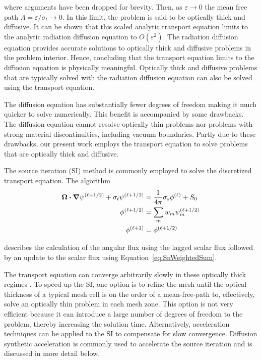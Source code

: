 \documentclass{article}
\begin{document}
\noindent where arguments have been dropped for brevity. Then, as $\varepsilon \rightarrow 0$ the mean free path $\Lambda = \varepsilon / \sigma_t \rightarrow 0$. In this limit, the problem is said to be optically thick and diffusive. It can be shown \cite{MalvagiAsymptoticAnalysis} that this scaled analytic transport equation limits to the analytic radiation diffusion equation to $O(\varepsilon^2)$. The radiation diffusion equation provides accurate solutions to optically thick and diffusive problems in the problem interior. Hence, concluding that the transport equation limits to the diffusion equation is physically meaningful. Optically thick and diffusive problems that are typically solved with the radiation diffusion equation can also be solved using the transport equation.

The diffusion equation has substantially fewer degrees of freedom making it much quicker to solve numerically. This benefit is accompanied by some drawbacks. The diffusion equation cannot resolve optically thin problems nor problems with strong material discontinuities, including vacuum boundaries. Partly due to these drawbacks, our present work employs the transport equation to solve problems that are optically thick and diffusive.

The source iteration (SI) method \cite{Lewis_Comp_Methods_Neu_Trans} is commonly employed to solve the discretized transport equation. The algorithm
\begin{subequations}
\begin{flalign}
\bm{\Omega} \bm{\cdot} \bm{\nabla} \psi^{(\ell+1/2)} + \sigma_t \psi^{(\ell+1/2)} & = \frac{1}{4 \pi} \sigma_s \phi^{(\ell)} + S_0 \\
\phi^{(\ell+1/2)} & = \sum_m w_m \psi^{(\ell+1/2)}_m \\
\phi^{(\ell+1)} & = \phi^{(\ell+1/2)}
\end{flalign}
\label{eqs:SourceIteration}
\end{subequations}

\noindent describes the calculation of the angular flux using the lagged scalar flux followed by an update to the scalar flux using Equation~\ref{eq:SnWeightedSum}.

The transport equation can converge arbitrarily slowly in these optically thick regimes \cite{LarsenStableDSATheory}. To speed up the SI, one option is to refine the mesh until the optical thickness of a typical mesh cell is on the order of a mean-free-path to, effectively, solve an optically thin problem in each mesh zone. This option is not very efficient because it can introduce a large number of degrees of freedom to the problem, thereby increasing the solution time. Alternatively, acceleration techniques can be applied to the SI to compensate for slow convergence. Diffusion synthetic acceleration is commonly used to accelerate the source iteration and is discussed in more detail below.
\end{document}
